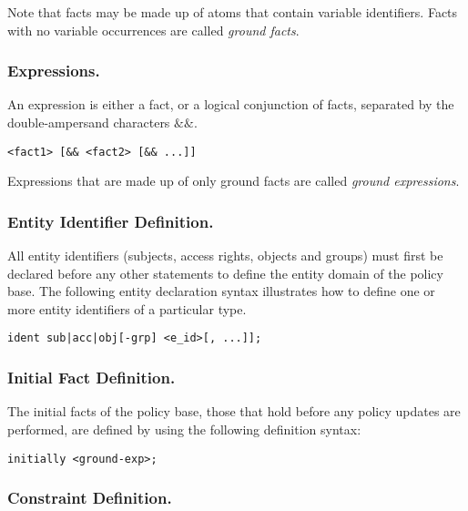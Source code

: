 \documentclass[11pt]{llncs}
\begin{document}
        Note that facts may be made up of atoms that contain variable
        identifiers. Facts with no variable occurrences are called {\em ground
        facts}.

      \subsubsection{Expressions.}

        An expression is either a fact, or a logical conjunction of facts,
        separated by the double-ampersand characters $\&\&$.

        \begin{verbatim}<fact1> [&& <fact2> [&& ...]]\end{verbatim}

        Expressions that are made up of only ground facts are called
        {\em ground expressions}.

      \subsubsection{Entity Identifier Definition.}

        All entity identifiers (subjects, access rights, objects and groups)
        must first be declared before any other statements to define the
        entity domain of the policy base. The following entity declaration
        syntax illustrates how to define one or more entity identifiers of a
        particular type.

        \begin{verbatim}ident sub|acc|obj[-grp] <e_id>[, ...]];\end{verbatim}

      \subsubsection{Initial Fact Definition.}

        The initial facts of the policy base, those that hold before any
        policy updates are performed, are defined by using the following
        definition syntax:

        \begin{verbatim}initially <ground-exp>;\end{verbatim}

      \subsubsection{Constraint Definition.}
\end{document}

